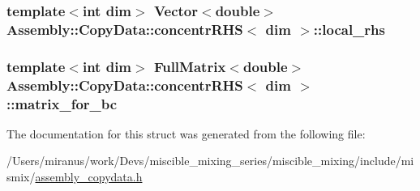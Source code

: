 \subsubsection[{local\+\_\+rhs}]{\setlength{\rightskip}{0pt plus 5cm}template$<$int dim$>$ Vector$<$double$>$ {\bf Assembly\+::\+Copy\+Data\+::concentr\+R\+H\+S}$<$ dim $>$\+::local\+\_\+rhs}\label{struct_assembly_1_1_copy_data_1_1concentr_r_h_s_aa16d978b90728b2e6118f642cd012d53}
\hypertarget{struct_assembly_1_1_copy_data_1_1concentr_r_h_s_af68abcf2cce508ca241f8a57a4160b5d}{}
\subsubsection[{matrix\+\_\+for\+\_\+bc}]{\setlength{\rightskip}{0pt plus 5cm}template$<$int dim$>$ Full\+Matrix$<$double$>$ {\bf Assembly\+::\+Copy\+Data\+::concentr\+R\+H\+S}$<$ dim $>$\+::matrix\+\_\+for\+\_\+bc}\label{struct_assembly_1_1_copy_data_1_1concentr_r_h_s_af68abcf2cce508ca241f8a57a4160b5d}


The documentation for this struct was generated from the following file\+:\begin{DoxyCompactItemize}
\item 
/\+Users/miranus/work/\+Devs/miscible\+\_\+mixing\+\_\+series/miscible\+\_\+mixing/include/mismix/\hyperlink{assembly__copydata_8h}{assembly\+\_\+copydata.\+h}\end{DoxyCompactItemize}
